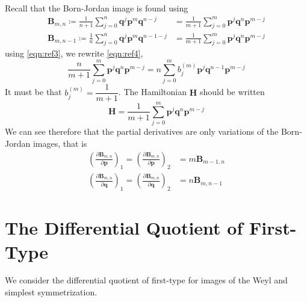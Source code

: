 \documentclass[a4paper]{article}
\theoremstyle{definition}
\begin{document}
		Recall that the Born-Jordan image is found using
		\begin{align}
			\textbf{B}_{m,n}\coloneqq\frac{1}{n+1}\sum_{j=0}^n\textbf{q}^j\textbf{p}^m\textbf{q}^{n-j}&=\frac{1}{m+1}\sum_{j=0}^{m}\textbf{p}^j\textbf{q}^n\textbf{p}^{m-j} \\
			\textbf{B}_{m,n-1}\coloneqq\frac{1}{n}\sum_{j=0}^n\textbf{q}^j\textbf{p}^m\textbf{q}^{n-1-j}&=\frac{1}{m+1}\sum_{j=0}^{m}\textbf{p}^j\textbf{q}^n\textbf{p}^{m-j} \label{eqn:ref3}
		\end{align}
		using \ref{eqn:ref3}, we rewrite \ref{eqn:ref4},
		\begin{equation}
			\frac{n}{m+1}\sum_{j=0}^{m}\textbf{p}^j\textbf{q}^n\textbf{p}^{m-j} =n\sum_{j=0}^{m}b_j^{(m)}\textbf{p}^j\textbf{q}^{n-1}\textbf{p}^{m-j}
		\end{equation}
		It must be that $b_j^{(m)}=\dfrac{1}{m+1}$. The Hamiltonian $\textbf{H}$ should be written
		\begin{equation}
			\textbf{H}=\frac{1}{m+1}\sum_{j=0}^m\textbf{p}^j\textbf{q}^n\textbf{p}^{m-j}
		\end{equation}
		We can see therefore that the partial derivatives are only variations of the Born-Jordan images, that is
		\begin{eqnarray}
			\left(\frac{\partial\textbf{B}_{m,n}}{\partial\textbf{p}}\right)_1=\left(\frac{\partial\textbf{B}_{m,n}}{\partial\textbf{p}}\right)_2&=m\textbf{B}_{m-1,n} \\
			\left(\frac{\partial\textbf{B}_{m,n}}{\partial\textbf{q}}\right)_1=\left(\frac{\partial\textbf{B}_{m,n}}{\partial\textbf{q}}\right)_2&=n\textbf{B}_{m,n-1}
		\end{eqnarray}
		
\section{The Differential Quotient of First-Type}
We consider the differential quotient of first-type for images of the Weyl and simplest symmetrization.
\end{document}
